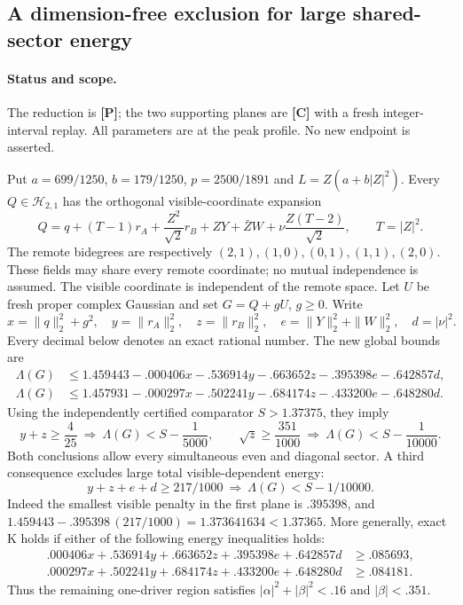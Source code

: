 \subsection{A dimension-free exclusion for large shared-sector energy}
\label{sec:full-cubic-profile-exclusion}
\paragraph{Status and scope.} The reduction is \textbf{[P]}; the two
supporting planes are \textbf{[C]} with a fresh integer-interval replay.
All parameters are at the peak profile. No new endpoint is asserted.

Put $a=699/1250$, $b=179/1250$, $p=2500/1891$ and
$L=Z(a+b|Z|^2)$. Every $Q\in\mathcal H_{2,1}$ has the orthogonal
visible-coordinate expansion
\[
 Q=q+(T-1)r_A+\frac{Z^2}{\sqrt2}r_B+ZY+\bar ZW
       +\nu\frac{Z(T-2)}{\sqrt2},\qquad T=|Z|^2.
\]
The remote bidegrees are respectively $(2,1),(1,0),(0,1),(1,1),(2,0)$.
These fields may share every remote coordinate; no mutual independence
is assumed. The visible coordinate is independent of the remote space.
Let $U$ be fresh proper complex Gaussian and set $G=Q+gU$, $g\ge0$.
Write
\[
 x=\|q\|_2^2+g^2,\quad y=\|r_A\|_2^2,\quad z=\|r_B\|_2^2,
 \quad e=\|Y\|_2^2+\|W\|_2^2,\quad d=|\nu|^2.
\]
Every decimal below denotes an exact rational number. The new global
bounds are
\begin{align*}
 \Lambda(G)&\le1.459443-.000406x-.536914y-.663652z
                         -.395398e-.642857d,\\
 \Lambda(G)&\le1.457931-.000297x-.502241y-.684174z
                         -.433200e-.648280d.
\end{align*}
Using the independently certified comparator $S>1.37375$, they imply
\[
 \boxed{y+z\ge\frac4{25}\ \Longrightarrow\
              \Lambda(G)<S-\frac1{5000}},\qquad
 \boxed{\sqrt z\ge\frac{351}{1000}\ \Longrightarrow\
              \Lambda(G)<S-\frac1{10000}}.
\]
Both conclusions allow every simultaneous even and diagonal sector.
A third consequence excludes large total visible-dependent energy:
\[
 \boxed{y+z+e+d\ge217/1000\ \Longrightarrow\
            \Lambda(G)<S-1/10000}.
\]
Indeed the smallest visible penalty in the first plane is $.395398$,
and $1.459443-.395398\,(217/1000)=1.373641634<1.37365$.
More generally, exact K holds if either of the following energy
inequalities holds:
\begin{align*}
 .000406x+.536914y+.663652z+.395398e+.642857d&\ge.085693,\\
 .000297x+.502241y+.684174z+.433200e+.648280d&\ge.084181.
\end{align*}
Thus the remaining one-driver region satisfies
$|\alpha|^2+|\beta|^2<.16$ and $|\beta|<.351$.

